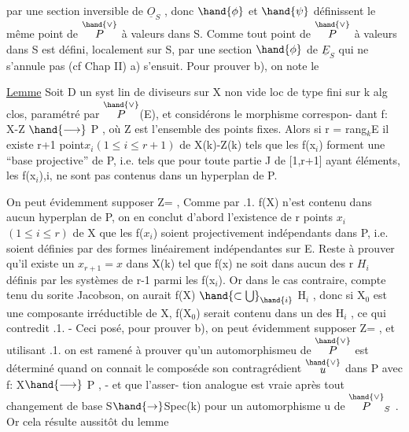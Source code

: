 
par une section inversible de $\underline{O}_S$ , donc $\hand{\phi}$ et $\hand{\psi}$ définissent le même point
de $\overset{\hand{\vee}}{P}$ à valeurs dans S. Comme tout point de $\overset{\hand{\vee}}{P}$ à valeurs dans S est défini,
localement sur S, par une section $\hand{\phi}$ de $\underline{E}_S$ qui ne s'annule pas (cf Chap II)
a) s'ensuit.   Pour prouver b), on note le

\uline{Lemme}   Soit D un syst lin de diviseurs sur X non vide loc de type fini
sur k alg clos, paramétré par $\overset{\hand{\vee}}{P}$(E), et considérons le morphisme correspon-%
dant  f: X-Z $\hand{\longrightarrow}$ P , où Z est l'ensemble des points fixes. Alors  si
r = rang$_k$E  il existe  r+1 point$x_i$$(1\leq i\leq r+1)$ de  X(k)-Z(k)  tels que les
f(x$_i$) forment une  ``base projective'' de P, i.e. tels que  pour toute
partie J de [1,r+1] ayant   éléments,  les  f(x$_i$),i,  ne sont pas
contenus dans un hyperplan de P.

On peut évidemment supposer Z=\hand{$\emptyset$} ,   Comme par .1. f(X) n'est contenu dans
aucun hyperplan de P, on en conclut d'abord l'existence de r points
$x_i$$(1\leq i\leq r)$ de X  que les f($x_i$) soient projectivement indépendants dans P, i.e. soient définies
par des formes linéairement indépendantes sur E.   Reste à prouver qu'il
existe un  $x_{r+1} = x$   dans X(k) tel que  f(x) ne soit dans aucun des r
 $H_i$ définis par les  systèmes de r-1 parmi les f(x$_i$). Or dans
le cas contraire, compte tenu du sorite Jacobson,  on aurait
f(X) $\hand{\subset\bigcup}_{\hand{i}}$ H$_i$ , donc  si X$_0$  est une composante
irréductible de X, f(X$_0$) serait contenu dans un des H$_i$ , ce qui contredit
.1. - Ceci posé,  pour prouver b), on peut  évidemment supposer Z=\hand{$\emptyset$} ,
et utilisant .1.  on est ramené à prouver qu'un automorphismeu de $\overset{\hand{\vee}}{P}$ est
déterminé quand on connait le composéde son contragrédient $\overset{\hand{\vee}}{u}$ dans P avec f: X$\hand{\longrightarrow}$ P , - et que l'asser-%
tion analogue est vraie après tout changement de base S$\hand{\rightarrow}$Spec(k)
pour un  automorphisme u de $\overset{\hand{\vee}}{P}_S$  .  Or cela résulte aussitôt  du lemme

